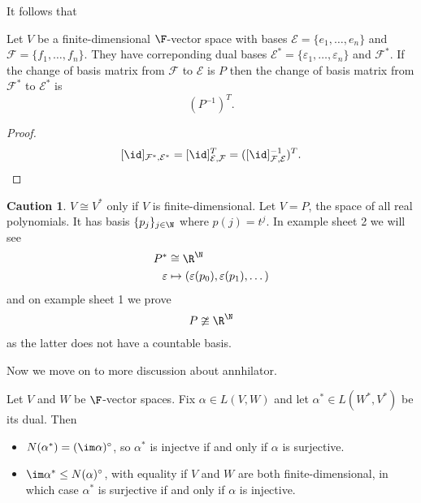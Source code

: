 \documentclass[a4paper]{article}
\newcommand*{\ann}{\circ}
\newcommand*{\basis}{\mathcal}
\theoremstyle{definition}
\newtheorem*{caution}{Caution}
\begin{document}
It follows that
\begin{lemma}
  Let \(V\) be a finite-dimensional \(\F\)-vector space with bases \(\basis E = \{e_1,\dots,e_n\}\) and \(\basis F = \{f_1,\dots,f_n\}\). They have correponding dual bases \(\basis E^* = \{\varepsilon_1,\dots, \varepsilon_n\}\) and \(\basis F^*\). If the change of basis matrix from \(\basis F\) to \(\basis E\) is \(P\) then the change of basis matrix from \(\basis F^*\) to \(\basis E^*\) is
  \[
    (P^{-1})^T.
  \]
\end{lemma}

\begin{proof}
  \[
    [\id]_{\basis F^*,\basis E^*} = [\id]_{\basis E, \basis F}^T = ([\id]_{\basis F, \basis E}^{-1})^T.
  \]
\end{proof}

\begin{caution}
  \(V \cong V^*\) only if \(V\) is finite-dimensional. Let \(V = P\), the space of all real polynomials. It has basis \(\{p_j\}_{j\in \N}\) where \(p(j) = t^j\). In example sheet 2 we will see
\begin{align*}
  P^* &\cong \R^\N \\
  \varepsilon &\mapsto (\varepsilon(p_0), \varepsilon(p_1), \dots)
\end{align*}
and on example sheet 1 we prove
\[
  P \ncong \R^\N
\]
as the latter does not have a countable basis.
\end{caution}

Now we move on to more discussion about annhilator.

\begin{lemma}
  Let \(V\) and \(W\) be \(\F\)-vector spaces. Fix \(\alpha \in L(V,W)\) and let \(\alpha^* \in L(W^*, V^*)\) be its dual. Then
  \begin{itemize}
  \item \(N(\alpha^*) = (\im \alpha)^\ann\), so \(\alpha^*\) is injectve if and only if \(\alpha\) is surjective.
  \item \(\im \alpha^* \leq N(\alpha)^\ann\), with equality if \(V\) and \(W\) are both finite-dimensional, in which case \(\alpha^*\) is surjective if and only if \(\alpha\) is injective.
  \end{itemize}
\end{lemma}
\end{document}
